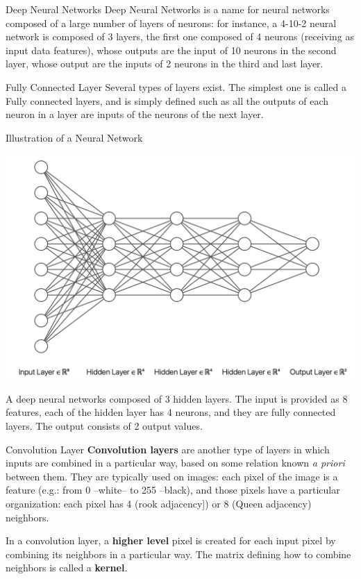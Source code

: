 \documentclass[a4paper,11pt]{book}
\begin{document}
\begin{textbox}{Deep Neural Networks}
Deep Neural Networks is a name for neural networks composed of a large number of layers of neurons: for instance, a 4-10-2 neural network is composed of 3 layers, the first one composed of 4 neurons (receiving as input data features), whose outputs are the input of 10 neurons in the second layer, whose output are the inputs of 2 neurons in the third and last layer.
\end{textbox}




\begin{textbox}{Fully Connected Layer}
Several types of layers exist. The simplest one is called a Fully connected layers, and is simply defined such as all the outputs of each neuron in a layer are inputs of the neurons of the next layer.
\end{textbox}


\begin{textbox}{Illustration of a Neural Network}

\centering

\includegraphics[width=0.7\linewidth]{pics/NN_SVG.png}

A deep neural networks composed of 3 hidden layers. The input is provided as 8 features, each of the hidden layer has 4 neurons, and they are fully connected layers. The output consists of 2 output values.
\end{textbox}


\begin{textbox}{Convolution Layer}
\textbf{Convolution layers} are another type of layers in which inputs are combined in a particular way, based on some relation known \textit{a priori} between them. They are typically used on images: each pixel of the image is a feature (e.g.: from 0 --white-- to 255 --black), and those pixels have a particular organization: each pixel has 4 (rook adjacency]) or 8 (Queen adjacency) neighbors. 

In a convolution layer, a \textbf{higher level} pixel is created for each input pixel by combining its neighbors in a particular way. The matrix defining how to combine neighbors is called a \textbf{kernel}.
\end{textbox}
\end{document}
